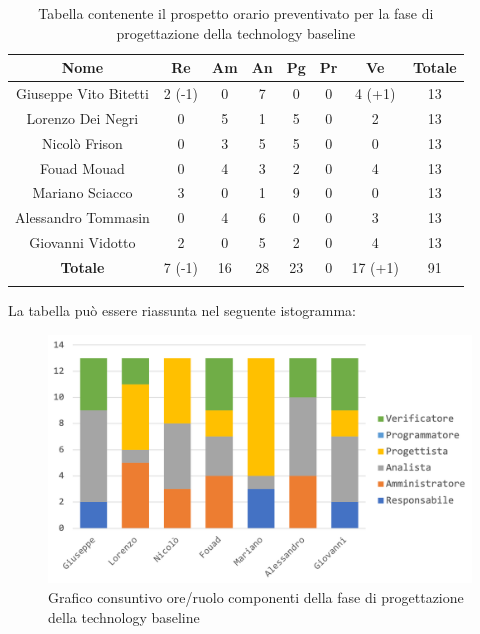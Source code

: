 			\begin{longtable}{|c|c|c|c|c|c|c|c}
				\hline
				\rowcolor{lighter-grayer}
				\textbf{Nome} & \textbf{Re} & \textbf{Am} & \textbf{An} & \textbf{Pg}  & \textbf{Pr}   & \textbf{Ve} & \textbf{Totale} \\
				\hline
				\endfirsthead
				\hline
				Giuseppe Vito Bitetti & 2 (-1) & 0 & 7 & 0 & 0 & 4 (+1) & 13\\
				\hline
				\hline
				Lorenzo Dei Negri & 0 & 5 & 1 & 5 & 0 & 2 & 13\\
				\hline
				\hline
				Nicolò Frison & 0 & 3 & 5 & 5 & 0 & 0 & 13\\
				\hline
				\hline
				Fouad Mouad & 0 & 4 & 3 & 2 & 0 & 4 & 13 \\
				\hline
				\hline
				Mariano Sciacco & 3 & 0 & 1 & 9 & 0 & 0 & 13\\
				\hline
				\hline
				Alessandro Tommasin & 0 & 4 & 6 & 0 & 0 & 3  & 13\\
				\hline
				\hline
				Giovanni Vidotto & 2 & 0 & 5 & 2 & 0 & 4 & 13\\
				\hline 
				\textbf{Totale} & 7 (-1) &  16 & 28 & 23 & 0 & 17 (+1) & 91 \\
				\hline
				
				\caption{Tabella contenente il prospetto orario preventivato per la fase di progettazione della technology baseline}
			\end{longtable}
			
			La tabella può essere riassunta nel seguente istogramma:
			
			\begin{figure}[H]
				\centering
				\includegraphics[width=0.8\linewidth]{images/consuntivo/ConsCorrez1.png}
				\caption{Grafico consuntivo ore/ruolo componenti della fase di progettazione della technology baseline}
				\label{fig:consuntivo grafico suddivione ruoli fase di progettazione della technology baseline}
			\end{figure}
		\pagebreak
			
